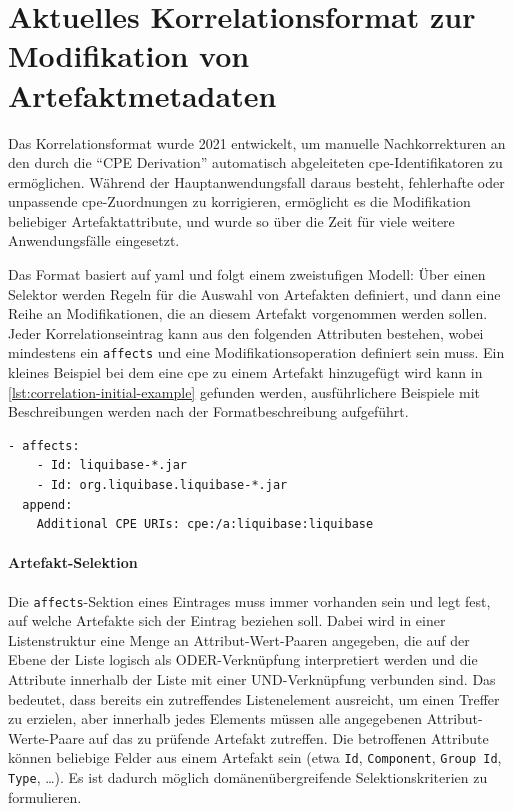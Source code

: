 \section{Aktuelles Korrelationsformat zur Modifikation von Artefaktmetadaten}\label{sec:current-correlation-format}

Das Korrelationsformat wurde 2021 entwickelt, um manuelle Nachkorrekturen an den durch die \enquote{CPE Derivation} automatisch abgeleiteten \acrshort{cpe}-Identifikatoren zu ermöglichen.
Während der Hauptanwendungsfall daraus besteht, fehlerhafte oder unpassende \acrshort{cpe}-Zuordnungen zu korrigieren, ermöglicht es die Modifikation beliebiger Artefaktattribute, und wurde so über die Zeit für viele weitere Anwendungsfälle eingesetzt.

Das Format basiert auf \acrfull{yaml} und folgt einem zweistufigen Modell:
Über einen Selektor werden Regeln für die Auswahl von Artefakten definiert, und dann eine Reihe an Modifikationen, die an diesem Artefakt vorgenommen werden sollen.
Jeder Korrelationseintrag kann aus den folgenden Attributen bestehen, wobei mindestens ein \texttt{affects} und eine Modifikationsoperation definiert sein muss.
Ein kleines Beispiel bei dem eine \acrshort{cpe} zu einem Artefakt hinzugefügt wird kann in \autoref{lst:correlation-initial-example} gefunden werden, ausführlichere Beispiele mit Beschreibungen werden nach der Formatbeschreibung aufgeführt.

\begin{lstlisting}[style=yaml,caption={Korrelationseintrag für die Java-Komponente Liquibase},label={lst:correlation-initial-example}]
- affects:
    - Id: liquibase-*.jar
    - Id: org.liquibase.liquibase-*.jar
  append:
    Additional CPE URIs: cpe:/a:liquibase:liquibase
\end{lstlisting}

\paragraph{Artefakt-Selektion}
Die \texttt{affects}-Sektion eines Eintrages muss immer vorhanden sein und legt fest, auf welche Artefakte sich der Eintrag beziehen soll.
Dabei wird in einer Listenstruktur eine Menge an Attribut-Wert-Paaren angegeben, die auf der Ebene der Liste logisch als ODER-Verknüpfung interpretiert werden und die Attribute innerhalb der Liste mit einer UND-Verknüpfung verbunden sind.
Das bedeutet, dass bereits ein zutreffendes Listenelement ausreicht, um einen Treffer zu erzielen, aber innerhalb jedes Elements müssen alle angegebenen Attribut-Werte-Paare auf das zu prüfende Artefakt zutreffen.
Die betroffenen Attribute können beliebige Felder aus einem Artefakt sein (etwa \texttt{Id}, \texttt{Component}, \texttt{Group Id}, \texttt{Type}, \ldots).
Es ist dadurch möglich domänenübergreifende Selektionskriterien zu formulieren.

